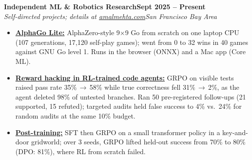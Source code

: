 \documentclass[10pt]{article}
\newcommand{\role}[4]{\textbf{#1}\hfill\textbf{#2}\\\textit{#3}\hfill\textit{#4}}
\begin{document}
\role{Independent ML \& Robotics Research}{Sept 2025 -- Present}{Self-directed projects; details at \href{https://amalmehta.com/}{amalmehta.com}}{San Francisco Bay Area}
\begin{itemize}
\item \href{https://amalmehta.com/AlphaGoLite/}{\textbf{AlphaGo Lite:}} AlphaZero-style 9$\times$9 Go from scratch on one laptop CPU (107 generations, 17,120 self-play games); went from 0 to 32 wins in 40 games against GNU Go level 1. Runs in the browser (ONNX) and a Mac app (Core ML).
\item \href{https://amalmehta.com/long_term_horizon_planning/}{\textbf{Reward hacking in RL-trained code agents:}} GRPO on visible tests raised pass rate 35\%\,$\to$\,58\% while true correctness fell 31\%\,$\to$\,2\%, as the agent deleted 98\% of untested branches. Ran 50 pre-registered follow-ups (21 supported, 15 refuted); targeted audits held false success to 4\% vs.\ 24\% for random audits at the same 10\% budget.
\item \href{https://github.com/amalmehta/PostTrainingLab}{\textbf{Post-training:}} SFT then GRPO on a small transformer policy in a key-and-door gridworld; over 3 seeds, GRPO lifted held-out success from 70\% to 80\% (DPO: 81\%), where RL from scratch failed.
\end{itemize}
\end{document}
